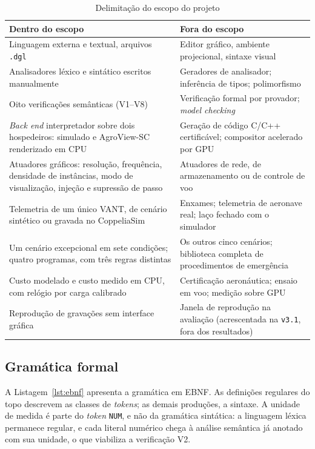 \documentclass[conference]{IEEEtran}
\begin{document}
\begin{table}[htbp]
\caption{Delimitação do escopo do projeto}
\label{tab:escopo}
\centering
\footnotesize
\begin{tabularx}{\columnwidth}{@{}LL@{}}
\toprule
\textbf{Dentro do escopo} & \textbf{Fora do escopo} \\
\midrule
Linguagem externa e textual, arquivos \texttt{.dgl} &
Editor gráfico, ambiente projecional, sintaxe visual \\
\addlinespace
Analisadores léxico e sintático escritos manualmente &
Geradores de analisador; inferência de tipos; polimorfismo \\
\addlinespace
Oito verificações semânticas (V1--V8) &
Verificação formal por provador; \textit{model checking} \\
\addlinespace
\textit{Back end} interpretador sobre dois hospedeiros: simulado e AgroView-SC
renderizado em CPU &
Geração de código C/C++ certificável; compositor acelerado por GPU \\
\addlinespace
Atuadores gráficos: resolução, frequência, densidade de instâncias, modo de
visualização, injeção e supressão de passo &
Atuadores de rede, de armazenamento ou de controle de voo \\
\addlinespace
Telemetria de um único VANT, de cenário sintético ou gravada no CoppeliaSim &
Enxames; telemetria de aeronave real; laço fechado com o simulador \\
\addlinespace
Um cenário excepcional em sete condições; quatro programas, com três regras
distintas &
Os outros cinco cenários; biblioteca completa de procedimentos de emergência \\
\addlinespace
Custo modelado e custo medido em CPU, com relógio por carga calibrado &
Certificação aeronáutica; ensaio em voo; medição sobre GPU \\
\addlinespace
Reprodução de gravações sem interface gráfica &
Janela de reprodução na avaliação (acrescentada na \texttt{v3.1}, fora dos
resultados) \\
\bottomrule
\end{tabularx}
\end{table}

\subsection{Gramática formal}
\label{sec:gramatica}

A Listagem~\ref{lst:ebnf} apresenta a gramática em EBNF. As definições
regulares do topo descrevem as classes de \textit{tokens}; as demais
produções, a sintaxe. A unidade de medida é parte do \textit{token}
\texttt{NUM}, e não da gramática sintática: a linguagem léxica permanece
regular, e cada literal numérico chega à análise semântica já anotado com sua
unidade, o que viabiliza a verificação V2.
\end{document}
